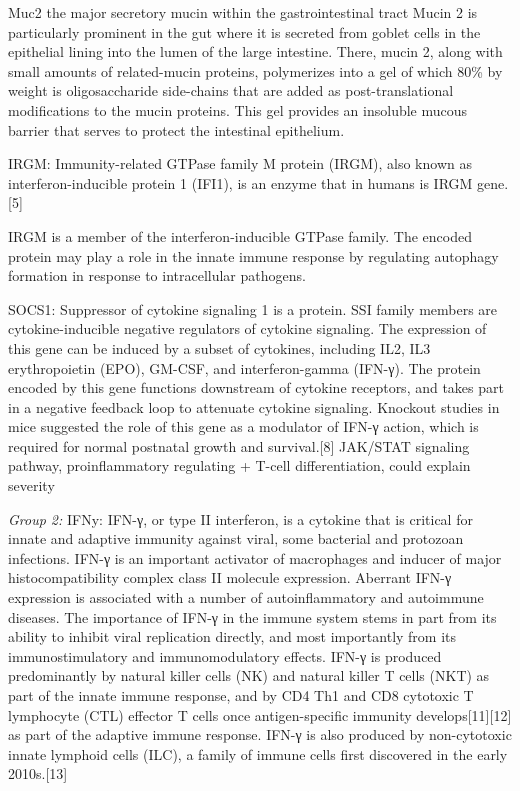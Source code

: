 \documentclass[
]{article}
\begin{document}
Muc2 the major secretory mucin within the gastrointestinal tract Mucin 2
is particularly prominent in the gut where it is secreted from goblet
cells in the epithelial lining into the lumen of the large intestine.
There, mucin 2, along with small amounts of related-mucin proteins,
polymerizes into a gel of which 80\% by weight is oligosaccharide
side-chains that are added as post-translational modifications to the
mucin proteins. This gel provides an insoluble mucous barrier that
serves to protect the intestinal epithelium.

IRGM: Immunity-related GTPase family M protein (IRGM), also known as
interferon-inducible protein 1 (IFI1), is an enzyme that in humans is
IRGM gene.{[}5{]}

IRGM is a member of the interferon-inducible GTPase family. The encoded
protein may play a role in the innate immune response by regulating
autophagy formation in response to intracellular pathogens.

SOCS1: Suppressor of cytokine signaling 1 is a protein. SSI family
members are cytokine-inducible negative regulators of cytokine
signaling. The expression of this gene can be induced by a subset of
cytokines, including IL2, IL3 erythropoietin (EPO), GM-CSF, and
interferon-gamma (IFN-γ). The protein encoded by this gene functions
downstream of cytokine receptors, and takes part in a negative feedback
loop to attenuate cytokine signaling. Knockout studies in mice suggested
the role of this gene as a modulator of IFN-γ action, which is required
for normal postnatal growth and survival.{[}8{]} JAK/STAT signaling
pathway, proinflammatory regulating + T-cell differentiation, could
explain severity

\emph{Group 2:} IFNy: IFN-γ, or type II interferon, is a cytokine that
is critical for innate and adaptive immunity against viral, some
bacterial and protozoan infections. IFN-γ is an important activator of
macrophages and inducer of major histocompatibility complex class II
molecule expression. Aberrant IFN-γ expression is associated with a
number of autoinflammatory and autoimmune diseases. The importance of
IFN-γ in the immune system stems in part from its ability to inhibit
viral replication directly, and most importantly from its
immunostimulatory and immunomodulatory effects. IFN-γ is produced
predominantly by natural killer cells (NK) and natural killer T cells
(NKT) as part of the innate immune response, and by CD4 Th1 and CD8
cytotoxic T lymphocyte (CTL) effector T cells once antigen-specific
immunity develops{[}11{]}{[}12{]} as part of the adaptive immune
response. IFN-γ is also produced by non-cytotoxic innate lymphoid cells
(ILC), a family of immune cells first discovered in the early
2010s.{[}13{]}
\end{document}
